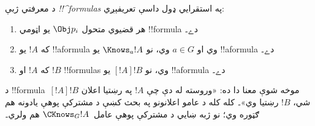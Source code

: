 \documentclass[../../../include/open-logic-section]{subfiles}
\begin{document}
\begin{defn}
  د معرفتي ژبې \emph{!!^{formula}s} په استقرايي ډول داسې
  تعريفېږي:
  \begin{enumerate}


  \item هر قضيوي متحول $\Obj p_i$ يو اټومي
  !!{formula} دے۔






  \item که $!A$ يو !!a{formula} وي او $a \in G$ وي، نو $\Knows_a !A$
  يو !!a{formula} دے۔
  
  \item که $!A$ او $!B$ !!{formula}s وي، نو $[!A] !B$ يو !!a{formula} دے۔

\end{enumerate}
\end{defn}

د !!{formula}~$[!A] !B$ موخه شوې معنا دا ده: «وروسته له دې چې
$!A$ په رښتيا اعلان شي، $!B$ رښتيا وي»۔ کله کله د عامو اعلانونو
په بحث کښې د مشترکې پوهې يادونه هم ګټوره وي؛ نو ژبه ښايي د مشترکې
پوهې عامل~$\CKnows_G
!A$ هم ولري۔
\end{document}
